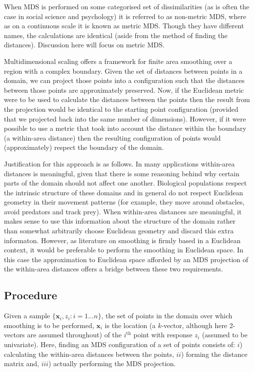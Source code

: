When MDS is performed on some categorised set of dissimilarities (as is often the case in social science and psychology) it is referred to as non-metric MDS, where as on a continuous scale it is known as metric MDS. Though they have different names, the calculations are identical (aside from the method of finding the distances). Discussion here will focus on metric MDS.

Multidimensional scaling offers a framework for finite area smoothing over a region with a complex boundary. Given the set of distances between points in a domain, we can project those points into a configuration such that the distances between those points are approximately preserved. Now, if the Euclidean metric were to be used to calculate the distances between the points then the result from the projection would be identical to the starting point configuration (provided that we projected back into the same number of dimensions). However, if it were possible to use a metric that took into account the distance within the boundary (a within-area distance) then the resulting configuration of points would (approximately) respect the boundary of the domain.

Justification for this approach is as follows. In many applications within-area distances is meaningful, given that there is some reasoning behind why certain parts of the domain should not affect one another. Biological populations respect the intrinsic structure of these domains and in general do not respect Euclidean geometry in their movement patterns (for example, they move around obstacles, avoid predators and track prey). When within-area distances are meaningful, it makes sense to use this information about the structure of the domain rather than somewhat arbitrarily choose Euclidean geometry and discard this extra informaton. However, as literature on smoothing is firmly based in a Euclidean context, it would be preferable to perform the smoothing in Euclidean space. In this case the approximation to Euclidean space afforded by an MDS projection of the within-area distances offers a bridge between these two requirements.

\subsection{Procedure}
\label{mdsproc}
Given a sample $\{\bm{x}_i, z_i : i=1\dots n\}$, the set of points in the domain over which smoothing is to be performed, $\bm{x}_i$ is the location (a $k$-vector, although here 2-vectors are assumed throughout) of the $i^\text{th}$ point with response $z_i$ (assumed to be univariate). Here, finding an MDS configuration of a set of points consists of: $i$) calculating the within-area distances between the points, $ii$) forming the distance matrix and, $iii$) actually performing the MDS projection.

